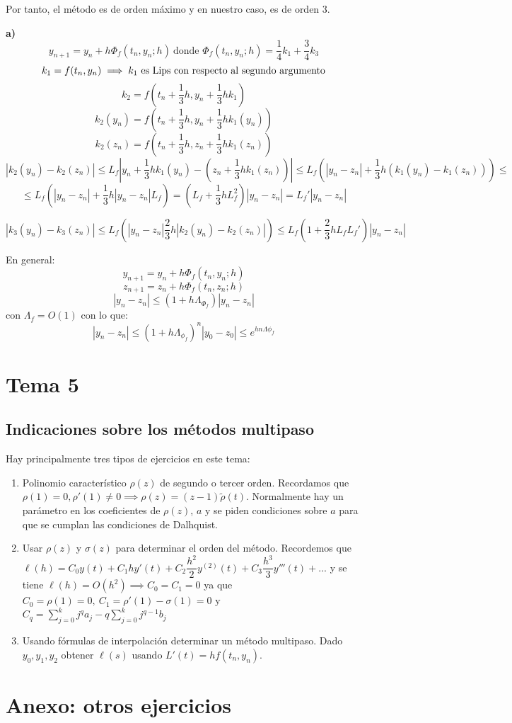 \documentclass[openany]{book}
\begin{document}
\begin{exercise}
        Por tanto, el método es de orden máximo y en nuestro caso, es de orden 3.

        \textbf{a)}
        $$ y_{n+1} = y_n+h \Phi_{f}(t_n,y_n;h)\ \text{donde } \Phi_{f}(t_n,y_n;h) = \dfrac{1}{4}k_1+\dfrac{3}{4}k_3 $$
        $$ k_1 = f(t_n,y_n) \implies \text{$ k_1 $ es Lips con respecto al segundo argumento} $$
        $$ k_2 = f(t_n+\dfrac{1}{3}h,y_n+\dfrac{1}{3}hk_1) $$
        $$ k_2(y_n) = f(t_n+\dfrac{1}{3}h,y_n+\dfrac{1}{3}hk_1(y_n)) $$
        $$ k_2(z_n) = f(t_n+\dfrac{1}{3}h,z_n+\dfrac{1}{3}hk_1(z_n)) $$
        $$ |k_2(y_n)- k_2(z_n) | \leq L_{f}|y_n+\dfrac{1}{3}hk_1(y_n) - (z_n+\dfrac{1}{3}hk_1(z_n))| \leq L_{f}(|y_n-z_n|+\dfrac{1}{3}h(k_1(y_n)-k_1(z_n)))\leq$$
        $$ \leq L_{f}(|y_n-z_n| + \dfrac{1}{3}h |y_n-z_n|L_{f}) = (L_{f}+\dfrac{1}{3}hL_{f}^2) |y_n-z_n| = L_{f}' |y_n-z_n| $$

        $$ |k_3(y_n) - k_3(z_n)| \leq L_{f}(|y_n-z_n|  \dfrac{2}{3}h|k_2(y_n)-k_2(z_n)|) \leq L_{f}(1+\dfrac{2}{3}hL_{f}L_{f}') |y_n-z_n| $$

        En general:
        $$ y_{n+1} = y_n + h \Phi_{f}(t_n,y_n;h) $$
        $$ z_{n+1} = z_n + h \Phi_{f}(t_n,z_n;h) $$
        $$ |y_n-z_n| \leq (1+h \Lambda _{\Phi_{f}}) |y_n-z_n| $$
        con $ \Lambda_{f} = O(1) $ con lo que:
        $$ |y_n-z_n| \leq (1+h \Lambda _{\phi_{f}})^{n} |y_0-z_0| \leq e^{hn \Lambda \phi_{f}} $$


    \end{exercise}


    \chapter{Tema 5}

    \section{Indicaciones sobre los métodos multipaso}

    Hay principalmente tres tipos de ejercicios en este tema:

    \begin{enumerate}
        \item Polinomio característico $ \rho(z) $ de segundo o tercer orden. Recordamos que $ \rho (1) = 0, \rho'(1) \ne 0 \implies \rho (z)= (z-1) \widetilde{\rho}(t)$. Normalmente hay un parámetro en los coeficientes de $ \rho(z) $, $ a $ y se piden condiciones sobre $ a $ para que se cumplan las condiciones de Dalhquist.
        \item Usar $ \rho(z) $ y $ \sigma (z) $ para determinar el orden del método. Recordemos que $ \ell(h) = C_0y(t) + C_1hy'(t) + C_2\dfrac{h^2}{2}y ^{(2)}(t) + C_3\dfrac{h^3}{3}y'''(t)+... $ y se tiene $ \ell(h) = O(h^2) \implies C_0 = C_1 = 0 $ ya que $ C_0 = \rho (1) = 0,\ C_1 = \rho'(1)-\sigma (1) = 0$ y $ C_{q} = \sum\limits_{j=0}^{k}j^{q}a_j - q \sum\limits_{j=0}^{k}j^{q-1}b_j $
        \item Usando fórmulas de interpolación determinar un método multipaso. Dado $ y_0,y_1,y_2 $ obtener $ \ell(s) $ usando $ L'(t)= hf(t_n,y_n) $.
    \end{enumerate}

    \chapter{Anexo: otros ejercicios}
\end{document}
